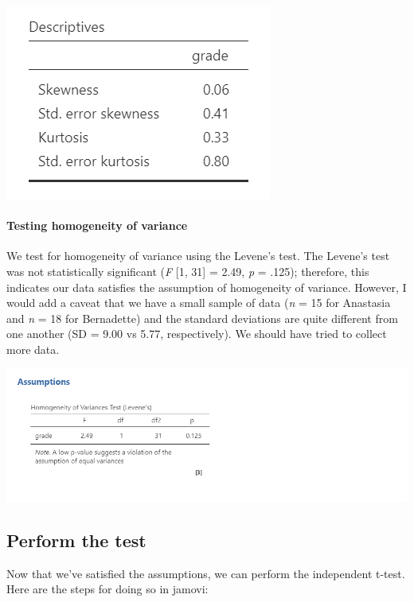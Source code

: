 \documentclass[
]{book}
\begin{document}
\includegraphics{images/02-independent_t-test/independent_t-test_skewkurtosis.png}

\hypertarget{testing-homogeneity-of-variance}{%
\paragraph{Testing homogeneity of variance}\label{testing-homogeneity-of-variance}}

We test for homogeneity of variance using the Levene's test. The Levene's test was not statistically significant (\emph{F} {[}1, 31{]} = 2.49, \emph{p} = .125); therefore, this indicates our data satisfies the assumption of homogeneity of variance. However, I would add a caveat that we have a small sample of data (\emph{n} = 15 for Anastasia and \emph{n} = 18 for Bernadette) and the standard deviations are quite different from one another (SD = 9.00 vs 5.77, respectively). We should have tried to collect more data.

\includegraphics{images/02-independent_t-test/independent_t-test_homogeneity.png}

\hypertarget{perform-the-test-1}{%
\subsection{Perform the test}\label{perform-the-test-1}}

Now that we've satisfied the assumptions, we can perform the independent t-test. Here are the steps for doing so in jamovi:
\end{document}
